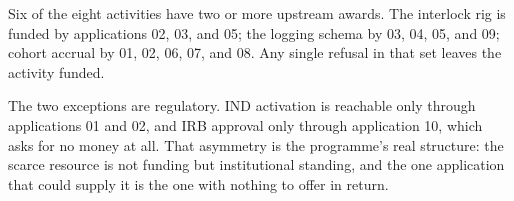 Six of the eight activities have two or more upstream awards. The interlock rig
is funded by applications 02, 03, and 05; the logging schema by 03, 04, 05, and
09; cohort accrual by 01, 02, 06, 07, and 08. Any single refusal in that set
leaves the activity funded.

The two exceptions are regulatory. IND activation is reachable only through
applications 01 and 02, and IRB approval only through application 10, which asks
for no money at all. That asymmetry is the programme's real structure: the
scarce resource is not funding but institutional standing, and the one
application that could supply it is the one with nothing to offer in return.
